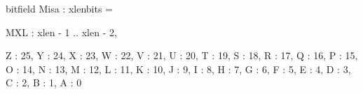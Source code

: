 bitfield Misa : xlenbits = {
  MXL  : xlen - 1 .. xlen - 2,

  Z    : 25,
  Y    : 24,
  X    : 23,
  W    : 22,
  V    : 21,
  U    : 20,
  T    : 19,
  S    : 18,
  R    : 17,
  Q    : 16,
  P    : 15,
  O    : 14,
  N    : 13,
  M    : 12,
  L    : 11,
  K    : 10,
  J    : 9,
  I    : 8,
  H    : 7,
  G    : 6,
  F    : 5,
  E    : 4,
  D    : 3,
  C    : 2,
  B    : 1,
  A    : 0
}

